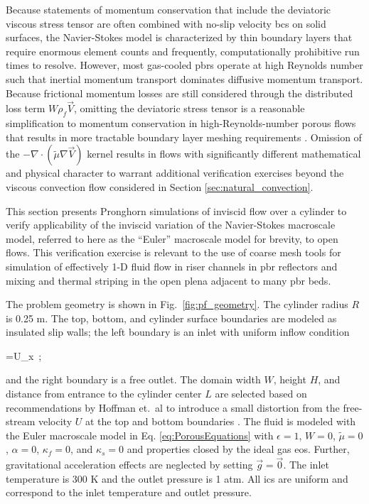 Because statements of momentum conservation that include the deviatoric viscous stress tensor are often combined with no-slip velocity \glspl{bc} on solid surfaces, the Navier-Stokes model is characterized by thin boundary layers that require enormous element counts and frequently, computationally prohibitive run times to resolve. However, most gas-cooled \glspl{pbr} operate at high Reynolds number such that inertial momentum transport dominates diffusive momentum transport. Because frictional momentum losses are still considered through the distributed loss term \(W\rho_f\vec{V}\), omitting the deviatoric stress tensor is a reasonable simplification to momentum conservation in high-Reynolds-number porous flows that results in more tractable boundary layer meshing requirements \cite{kececioglu}. Omission of the \(-\nabla\cdot(\tilde{\mu}\nabla\vec{V})\) kernel results in flows with significantly different mathematical and physical character to warrant additional verification exercises beyond the viscous convection flow considered in Section \ref{sec:natural_convection}.

This section presents Pronghorn simulations of inviscid flow over a cylinder to verify applicability of the inviscid variation of the Navier-Stokes macroscale model, referred to here as the ``Euler'' macroscale model for brevity, to open flows. This verification exercise is relevant to the use of coarse mesh tools for simulation of effectively 1-D fluid flow in riser channels in \gls{pbr} reflectors and mixing and thermal striping in the open plena adjacent to many \gls{pbr} beds. 

The problem geometry is shown in Fig.\ \ref{fig:pf_geometry}. The cylinder radius \(R\) is 0.25 \si{\meter}. The top, bottom, and cylinder surface boundaries are modeled as insulated slip walls; the left boundary is an inlet with uniform inflow condition

\beq
\label{eq:FreeStreamV}
=U_x\ ;
\eeq

\noindent and the right boundary is a free outlet. The domain width \(W\), height \(H\), and distance from entrance to the cylinder center \(L\) are selected based on recommendations by Hoffman et.\ al to introduce a small distortion from the free-stream velocity \(U\) at the top and bottom boundaries \cite{hoffman_2011}. The fluid is modeled with the Euler macroscale model in Eq. \eqref{eq:PorousEquations} with \(\epsilon=1\), \(W=0\), \(\tilde{\mu}=0\), \(\alpha=0\), \(\kappa_f=0\), and \(\kappa_s=0\) and properties closed by the ideal gas \gls{eos}. Further, gravitational acceleration effects are neglected by setting \(\vec{g}=\vec{0}\). The inlet temperature is 300 \si{\kelvin} and the outlet pressure is 1 atm. All \glspl{ic} are uniform and correspond to the inlet temperature and outlet pressure.

